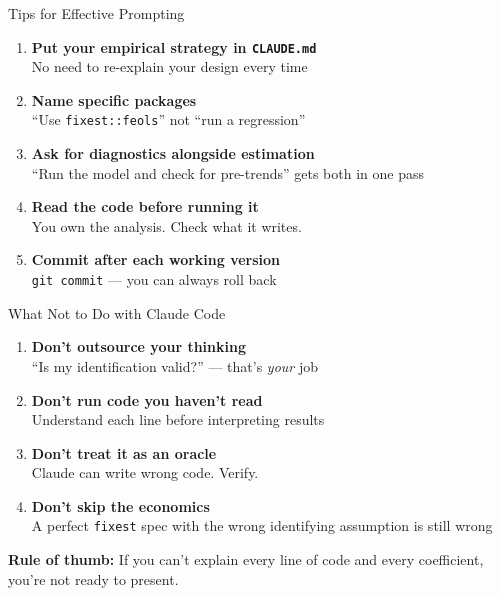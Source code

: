 \begin{frame}{Tips for Effective Prompting}
  \small
  \begin{enumerate}
    \item \textbf{Put your empirical strategy in \texttt{CLAUDE.md}}\\
      No need to re-explain your design every time

    \item \textbf{Name specific packages}\\
      ``Use \texttt{fixest::feols}'' not ``run a regression''

    \item \textbf{Ask for diagnostics alongside estimation}\\
      ``Run the model and check for pre-trends'' gets both in one pass

    \item \textbf{Read the code before running it}\\
      You own the analysis. Check what it writes.

    \item \textbf{Commit after each working version}\\
      \texttt{git commit} --- you can always roll back
  \end{enumerate}
\end{frame}

\begin{frame}{What Not to Do with Claude Code}
  \small
  \begin{enumerate}
    \item \textbf{Don't outsource your thinking}\\
      ``Is my identification valid?'' --- that's \textit{your} job

    \vspace{2pt}

    \item \textbf{Don't run code you haven't read}\\
      Understand each line before interpreting results

    \vspace{2pt}

    \item \textbf{Don't treat it as an oracle}\\
      Claude can write wrong code. Verify.

    \vspace{2pt}

    \item \textbf{Don't skip the economics}\\
      A perfect \texttt{fixest} spec with the wrong identifying assumption is still wrong
  \end{enumerate}

  \vspace{4pt}

  \vspace{4pt}

  \textbf{Rule of thumb:} If you can't explain every line of code and every coefficient, you're not ready to present.
\end{frame}

